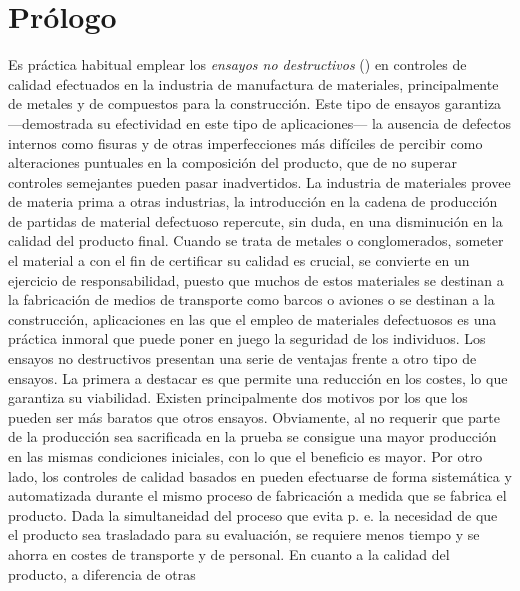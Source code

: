\chapter{Prólogo}

%

Es práctica habitual emplear los \emph{ensayos no destructivos}
() en controles de calidad efectuados en la industria de
manufactura de materiales, principalmente de metales y de compuestos para
la construcción. Este tipo de ensayos garantiza ---demostrada su
efectividad en este tipo de aplicaciones--- la ausencia de defectos
internos como fisuras y de otras imperfecciones más difíciles de percibir
como alteraciones puntuales en la composición del producto, que de no
superar controles semejantes pueden pasar inadvertidos. La industria de
materiales provee de materia prima a otras industrias, la introducción en
la cadena de producción de partidas de material defectuoso repercute, sin
duda, en una disminución en la calidad del producto final. Cuando se trata
de metales o conglomerados, someter el material a  con el fin de
certificar su calidad es crucial, se convierte en un ejercicio de
responsabilidad, puesto que muchos de estos materiales se destinan a la
fabricación de medios de transporte como barcos o aviones o se destinan a
la construcción, aplicaciones en las que el empleo de materiales
defectuosos es una práctica inmoral que puede poner en juego la seguridad
de los individuos. Los ensayos no destructivos presentan una serie de
ventajas frente a otro tipo de ensayos. La primera a destacar es que
permite una reducción en los costes, lo que garantiza su viabilidad.
Existen principalmente dos motivos por los que los  pueden ser más
baratos que otros ensayos. Obviamente, al no requerir que parte de la
producción sea sacrificada en la prueba se consigue una mayor producción en
las mismas condiciones iniciales, con lo que el beneficio es mayor. Por
otro lado, los controles de calidad basados en  pueden efectuarse
de forma sistemática y automatizada durante el mismo proceso de fabricación
a medida que se fabrica el producto. Dada la simultaneidad del proceso que
evita p. e. la necesidad de que el producto sea trasladado para su
evaluación, se requiere menos tiempo y se ahorra en costes de transporte y
de personal. En cuanto a la calidad del producto, a diferencia de otras
